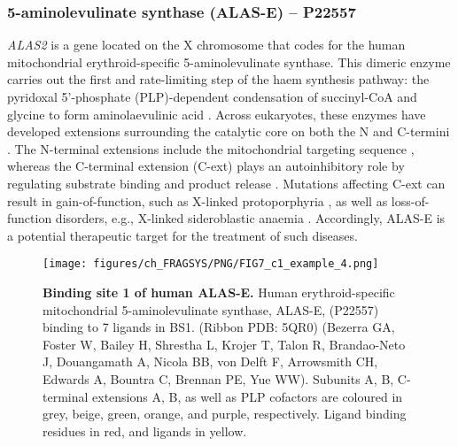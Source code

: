 \subsubsection{5-aminolevulinate synthase (ALAS-E) -- P22557}

\textit{ALAS2} is a gene located on the X chromosome that codes for the human mitochondrial erythroid-specific 5-aminolevulinate synthase. This dimeric enzyme carries out the first and rate-limiting step of the haem synthesis pathway: the pyridoxal 5’-phosphate (PLP)-dependent condensation of succinyl-CoA and glycine to form aminolaevulinic acid \cite{AKHTAR_1976_PORPHYRIN}. Across eukaryotes, these enzymes have developed extensions surrounding the catalytic core on both the N and C-termini \cite{MUNAKATA_1993_AMINOLEVULINATE}. The N-terminal extensions include the mitochondrial targeting sequence \cite{SRIVASTAVA_1988_AMINOLEVULINATE}, whereas the C-terminal extension (C-ext) plays an autoinhibitory role by regulating substrate binding and product release \cite{BAILEY_2020_AMINOLEVULINATE}. Mutations affecting C-ext can result in gain-of-function, such as X-linked protoporphyria \cite{WHATLEY_2008_AMINOLEVULINATE}, as well as loss-of-function disorders, e.g., X-linked sideroblastic anaemia \cite{DUCAMP_2011_SIDEROBLASTIC}. Accordingly, ALAS-E is a potential therapeutic target for the treatment of such diseases.

\begin{figure}[htb!]
    \centering
    \texttt{[image: figures/ch\_FRAGSYS/PNG/FIG7\_c1\_example\_4.png]}
    \caption[Binding site 1 of human ALAS-E]{\textbf{Binding site 1 of human ALAS-E.} Human erythroid-specific mitochondrial 5-aminolevulinate synthase, ALAS-E, (P22557) binding to 7 ligands in BS1. (Ribbon PDB: 5QR0) (Bezerra GA, Foster W, Bailey H, Shrestha L, Krojer T, Talon R, Brandao-Neto J, Douangamath A, Nicola BB, von Delft F, Arrowsmith CH, Edwards A, Bountra C, Brennan PE, Yue WW). Subunits A, B, C-terminal extensions A, B, as well as PLP cofactors are coloured in grey, beige, green, orange, and purple, respectively. Ligand binding residues in red, and ligands in yellow.}
    \label{fig:c1_example_4}
\end{figure}

